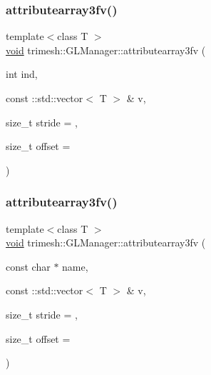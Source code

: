 \subsubsection{\texorpdfstring{attributearray3fv()}{attributearray3fv()}\hspace{0.1cm}{\footnotesize\ttfamily [3/6]}}
{\footnotesize\ttfamily template$<$class T $>$ \\
\hyperlink{namespacetrimesh_a784ddfd979e1c579bda795a8edfc3f43}{void} trimesh\+::\+G\+L\+Manager\+::attributearray3fv (\begin{DoxyParamCaption}\item[{int}]{ind,  }\item[{const \+::std\+::vector$<$ T $>$ \&}]{v,  }\item[{size\+\_\+t}]{stride = {},  }\item[{size\+\_\+t}]{offset = {} }\end{DoxyParamCaption})\hspace{0.3cm}{\ttfamily [inline]}}

\mbox{\label{classtrimesh_1_1GLManager_aade059bb469973ea84015ed8e3a333f7}} 
\subsubsection{\texorpdfstring{attributearray3fv()}{attributearray3fv()}\hspace{0.1cm}{\footnotesize\ttfamily [4/6]}}
{\footnotesize\ttfamily template$<$class T $>$ \\
\hyperlink{namespacetrimesh_a784ddfd979e1c579bda795a8edfc3f43}{void} trimesh\+::\+G\+L\+Manager\+::attributearray3fv (\begin{DoxyParamCaption}\item[{const char $\ast$}]{name,  }\item[{const \+::std\+::vector$<$ T $>$ \&}]{v,  }\item[{size\+\_\+t}]{stride = {},  }\item[{size\+\_\+t}]{offset = {} }\end{DoxyParamCaption})\hspace{0.3cm}{\ttfamily [inline]}}

\mbox{\label{classtrimesh_1_1GLManager_ac571bfe4467cffb8f18529207db7ffc6}} 
